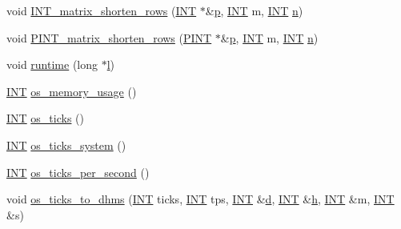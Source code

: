 \begin{DoxyCompactItemize}
\item 
void \mbox{\hyperlink{util_8_c_acdd91c1bc2dbbb55fca4f3a091ecbba5}{I\+N\+T\+\_\+matrix\+\_\+shorten\+\_\+rows}} (\mbox{\hyperlink{galois_8h_a09fddde158a3a20bd2dcadb609de11dc}{I\+NT}} $\ast$\&\mbox{\hyperlink{alphabet2_8_c_a533391314665d6bf1b5575e9a9cd8552}{p}}, \mbox{\hyperlink{galois_8h_a09fddde158a3a20bd2dcadb609de11dc}{I\+NT}} m, \mbox{\hyperlink{galois_8h_a09fddde158a3a20bd2dcadb609de11dc}{I\+NT}} \mbox{\hyperlink{simeon_8_c_a7f2cd26777ce0ff3fdaf8d02aacbddfb}{n}})
\item 
void \mbox{\hyperlink{util_8_c_afc6c8b9d099a3c564c88994ec233cf63}{P\+I\+N\+T\+\_\+matrix\+\_\+shorten\+\_\+rows}} (\mbox{\hyperlink{galois_8h_a3a27622aa6de9b4e74d9798d0aa4031b}{P\+I\+NT}} $\ast$\&\mbox{\hyperlink{alphabet2_8_c_a533391314665d6bf1b5575e9a9cd8552}{p}}, \mbox{\hyperlink{galois_8h_a09fddde158a3a20bd2dcadb609de11dc}{I\+NT}} m, \mbox{\hyperlink{galois_8h_a09fddde158a3a20bd2dcadb609de11dc}{I\+NT}} \mbox{\hyperlink{simeon_8_c_a7f2cd26777ce0ff3fdaf8d02aacbddfb}{n}})
\item 
void \mbox{\hyperlink{util_8_c_afd89917c4e250f5de843b75719dfabc1}{runtime}} (long $\ast$\mbox{\hyperlink{alphabet2_8_c_a89606eca6b563ec68d2da2e84657736f}{l}})
\item 
\mbox{\hyperlink{galois_8h_a09fddde158a3a20bd2dcadb609de11dc}{I\+NT}} \mbox{\hyperlink{util_8_c_a5d6ab4b80c58e5d8bdb0fd1625709d0b}{os\+\_\+memory\+\_\+usage}} ()
\item 
\mbox{\hyperlink{galois_8h_a09fddde158a3a20bd2dcadb609de11dc}{I\+NT}} \mbox{\hyperlink{util_8_c_a3da6d2b09e35d569adb7101dffcb5224}{os\+\_\+ticks}} ()
\item 
\mbox{\hyperlink{galois_8h_a09fddde158a3a20bd2dcadb609de11dc}{I\+NT}} \mbox{\hyperlink{util_8_c_acff4709d0a21a2f5462713436eca5051}{os\+\_\+ticks\+\_\+system}} ()
\item 
\mbox{\hyperlink{galois_8h_a09fddde158a3a20bd2dcadb609de11dc}{I\+NT}} \mbox{\hyperlink{util_8_c_a1b35e7a094dfde9db39ae352c9c17042}{os\+\_\+ticks\+\_\+per\+\_\+second}} ()
\item 
void \mbox{\hyperlink{util_8_c_a0d715587fd9b8ab4e2bc822a2be313ba}{os\+\_\+ticks\+\_\+to\+\_\+dhms}} (\mbox{\hyperlink{galois_8h_a09fddde158a3a20bd2dcadb609de11dc}{I\+NT}} ticks, \mbox{\hyperlink{galois_8h_a09fddde158a3a20bd2dcadb609de11dc}{I\+NT}} tps, \mbox{\hyperlink{galois_8h_a09fddde158a3a20bd2dcadb609de11dc}{I\+NT}} \&\mbox{\hyperlink{simeon_8_c_a4339ca06fa882e69473d37bd6d7917d1}{d}}, \mbox{\hyperlink{galois_8h_a09fddde158a3a20bd2dcadb609de11dc}{I\+NT}} \&\mbox{\hyperlink{alphabet2_8_c_a16611451551e3d15916bae723c3f59f7}{h}}, \mbox{\hyperlink{galois_8h_a09fddde158a3a20bd2dcadb609de11dc}{I\+NT}} \&m, \mbox{\hyperlink{galois_8h_a09fddde158a3a20bd2dcadb609de11dc}{I\+NT}} \&s)

\end{DoxyCompactItemize}
